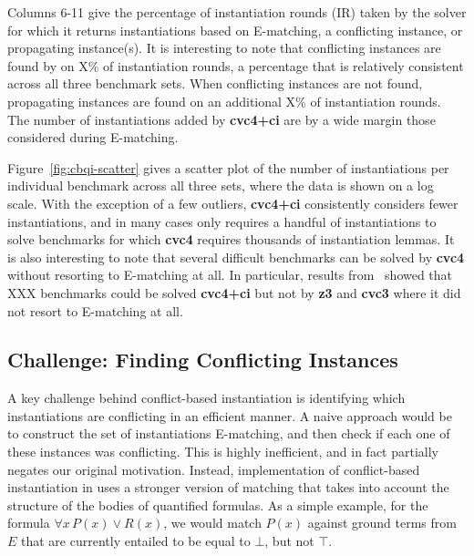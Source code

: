 \documentclass[oribibl]{llncs}
\begin{document}
Columns 6-11 give the percentage of instantiation rounds (IR) taken by the solver 
for which it returns instantiations based on E-matching, a conflicting instance,
or propagating instance(s).
It is interesting to note that conflicting instances are found by \cvc on
X\% of instantiation rounds, a percentage that is relatively consistent across all three benchmark sets.
When conflicting instances are not found, propagating instances are found on an additional X\% of instantiation rounds.
The number of instantiations added by {\bf cvc4+ci} are by a wide margin those considered during E-matching.

Figure~\ref{fig:cbqi-scatter} gives a scatter plot of the number of instantiations per individual benchmark
across all three sets, where the data is shown on a log scale.
With the exception of a few outliers, {\bf cvc4+ci} consistently considers fewer instantiations,
and in many cases only requires a handful of instantiations to solve benchmarks for which {\bf cvc4}
requires thousands of instantiation lemmas.
It is also interesting to note that several difficult benchmarks can be solved by {\bf cvc4}
without resorting to E-matching at all.
In particular, results from~\cite{} showed that XXX benchmarks could be solved {\bf cvc4+ci}
but not by {\bf z3} and {\bf cvc3} where it did not resort to E-matching at all.

\subsection{Challenge: Finding Conflicting Instances}
A key challenge behind conflict-based instantiation
is identifying which instantiations are conflicting in an efficient manner.
A naive approach would be to construct the set of instantiations E-matching, and then check if each one of these instances
was conflicting.
This is highly inefficient, and in fact partially negates our original motivation.
Instead, implementation of conflict-based instantiation in \cvc uses a stronger version of matching
that takes into account the structure of the bodies of quantified formulas.
As a simple example, for the formula $\forall x\, P( x ) \vee R( x )$, we would match
$P( x )$ against ground terms from $E$ that are currently entailed to be equal to $\bot$, but not $\top$.
\end{document}
